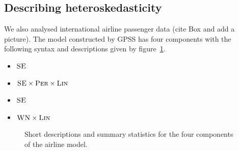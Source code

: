 \documentclass{article}
\begin{document}
\subsection{Describing heteroskedasticity}
\label{sec:airline}

We also analysed international airline passenger data (cite Box and add a picture).
The model constructed by GPSS has four components with the following syntax and descriptions given by figure~\ref{fig:exec-airline}.
\begin{itemize}
  \item ${\textsc{SE}}$
  \item ${\textsc{SE}} \times {\textsc{Per}} \times {\textsc{Lin}}$
  \item ${\textsc{SE}}$
  \item ${\textsc{WN}} \times {\textsc{Lin}}$
\end{itemize}

\begin{figure}[h]
\centering
{}
\caption{
Short descriptions and summary statistics for the four components of the airline model.}
\label{fig:exec-airline}
\end{figure}
\end{document}
